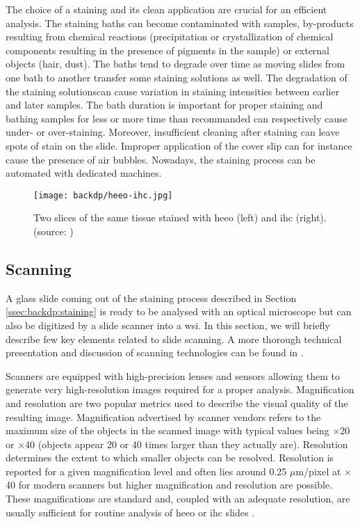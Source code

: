 The choice of a staining and its clean application are crucial for an efficient analysis. The staining baths can become contaminated with samples, by-products resulting from chemical reactions (\eg precipitation or crystallization of chemical components resulting in the presence of pigments in the sample) or external objects (\eg hair, dust). The baths tend to degrade over time as moving slides from one bath to another transfer some staining solutions as well. The degradation of the staining solutionscan cause variation in staining intensities between earlier and later samples. The bath duration is important for proper staining and bathing samples for less or more time than recommanded can respectively cause under- or over-staining. Moreover, insufficient cleaning after staining can leave spots of stain on the slide. Improper application of the cover slip can for instance cause the presence of air bubbles. Nowadays, the staining process can be automated with dedicated machines.

\begin{figure}
  \centering
  \texttt{[image: backdp/heeo-ihc.jpg]}
  \caption{Two slices of the same tissue stained with \acrshort{heeo} (left) and \acrshort{ihc} (right). \\(source: \parencite{litjens2018camelyon})}
  \label{fig:backdp:heeo-ihc}
\end{figure}

\subsection{Scanning}
\label{ssec:backdp:scanning}

A glass slide coming out of the staining process described in Section \ref{ssec:backdp:staining} is ready to be analysed with an optical microscope but can also be digitized by a slide scanner into a \acrshort{wsi}. In this section, we will briefly describe few key elements related to slide scanning. A more thorough technical presentation and discussion of scanning technologies can be found in \parencite{patel2021contemporary}. 

Scanners are equipped with high-precision lenses and sensors allowing them to generate very high-resolution images required for a proper analysis. Magnification and resolution are two popular metrics used to describe the visual quality of the resulting image. Magnification advertised by scanner vendors refers to the maximum size of the objects in the scanned image with typical values being $\times$20 or $\times$40 (\ie objects appear 20 or 40 times larger than they actually are). Resolution determines the extent to which smaller objects can be resolved. Resolution is reported for a given magnification level and often lies around 0.25 $\mu$m/pixel at $\times$40 for modern scanners but higher magnification and resolution are possible. These magnifications are standard and, coupled with an adequate resolution, are usually sufficient for routine analysis of \acrshort{heeo} or \acrshort{ihc} slides \parencite{zarella2019practical}.

